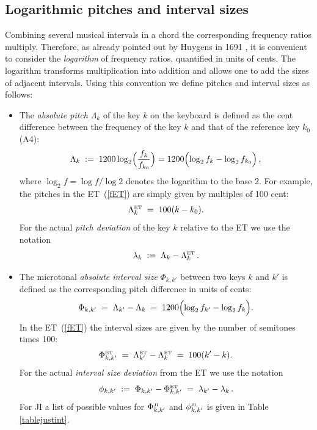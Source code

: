 \subsection{Logarithmic pitches and interval sizes}
Combining several musical intervals in a chord the corresponding frequency ratios multiply. Therefore, as already pointed out by Huygens in 1691 \cite{Huygens,Cohen}, it is convenient to consider the \textit{logarithm} of frequency ratios, quantified in units of cents. The logarithm transforms multiplication into addition and allows one to add the sizes of adjacent intervals. Using this convention we define pitches and interval sizes as follows:
%
\begin{itemize}
\item 
  The \textit{absolute pitch} $\Lambda_k$ of the key $k$ on the keyboard is defined as the cent difference between the frequency of the key $k$ and that of the reference key $k_0$ (A4):
  \begin{equation}
  \Lambda_k \;:=\; 1200 \log_2 \Bigl( \frac{f_k}{f_{k_0}}\Bigr)=1200\Bigl(\log_2 f_k- \log_2 f_{k_0}\Bigr) \,,
  \end{equation}
  where $\log_2 f =\log f/\log 2$ denotes the logarithm to the base 2. For example, the pitches in the ET~(\ref{fET}) are simply given by multiples of 100 cent:
  \begin{equation}
  \Lambda^{\rm\scriptscriptstyle ET}_k \;=\; 100(k-k_0).
  \end{equation}
  For the actual \textit{pitch deviation} of the key $k$ relative to the ET we use the notation
  \begin{equation}
  \lambda_k \;:=\; \Lambda_k - \Lambda^{\rm\scriptscriptstyle ET}_k \,.
  \end{equation}
  \vspace{4mm}

\item 
  The microtonal \textit{absolute interval size} $\Phi_{k,k'}$ between two keys $k$ and $k'$ is defined as the corresponding pitch difference in units of cents:  
  \begin{equation}
  \Phi_{k,k'} \;=\; \Lambda_{k'}-\Lambda_k \;=\; 1200\Bigl(\log_2 f_{k'}- \log_2 f_k\Bigr).
  \end{equation}
  In the ET~(\ref{fET}) the interval sizes are given by the number of semitones times 100:
  \begin{equation}
  \Phi^{\rm\scriptscriptstyle ET}_{k,k'} \;=\; \Lambda^{\rm\scriptscriptstyle ET}_{k'}-\Lambda^{\rm\scriptscriptstyle ET}_k \;=\; 100(k'-k).
  \end{equation}
  For the actual \textit{interval size deviation} from the ET we use the notation
  \begin{equation}
  \phi_{k,k'} \;:=\; \Phi_{k,k'} -\Phi^{\rm\scriptscriptstyle ET}_{k,k'} \;=\; \lambda_{k'}-\lambda_k \,. 
  \end{equation}
  For JI a list of possible values for $\Phi^{\rm\scriptscriptstyle JI}_{k,k'}$ and $\phi^{\rm\scriptscriptstyle JI}_{k,k'}$ is given in Table \ref{tablejustint}.
\end{itemize}
%
